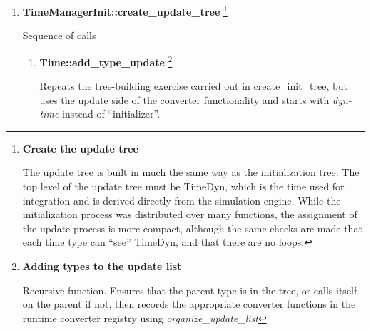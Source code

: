 {\begin{enumerate}
{\begin{enumerate}
{\begin{enumerate}
{\begin{enumerate}   %
\item \textbf{TimeConverter::initialize}
{\footnote{{\bf Initialize the converters}\par
To set the time from the parent, the converter
functions must be available.  Some of these may require some
initialization (e.g. the TAI to UTC converter requires finding the
appropriate values from data tables).  If the converter from parent to
child has not been initialized, that is completed before the
child's time is set as a call from
\textit{initialize\_from\_parent}.\par \ \ If the converter has not
been registered, the code will terminate.  This is redundant; if the
converter had not been registered, it could not have been used in
building the initialization tree.}}  \textit{(optional)}

Initializes any converter functions that are needed in the process.
\end{enumerate}}    %
\end{enumerate}}  %

\clearpage
\item \textbf{TimeManagerInit::create\_update\_tree}
{\footnote{{\bf Create the update tree}\par
The update tree is built in much the same way as
the initialization tree.  The top level of the update tree must be
TimeDyn, which is the time used for integration and is derived directly
from the simulation engine.  While the initialization process was
distributed over many functions, the assignment of the update process
is more compact, although the same checks are made that each time type
can {\textquotedblleft}see{\textquotedblright} TimeDyn, and that there
are no loops.}}

Sequence of calls
{\begin{enumerate}  %
\item \textbf{Time::add\_type\_update}
{\footnote{{\bf Adding types to the
update list}\par
Recursive function.  Ensures that the parent type
is in the tree, or calls itself on the parent if not, then records the
appropriate converter functions in the runtime converter registry using
\textit{organize\_update\_list}}} \par

Repeats the tree-building exercise carried out in create\_init\_tree,
but uses the update side of the converter functionality and starts with
\textit{dyn-time} instead of {\textquotedblleft}initializer{\textquotedblright}.


\end{enumerate}}
\end{enumerate}}
\end{enumerate}}

